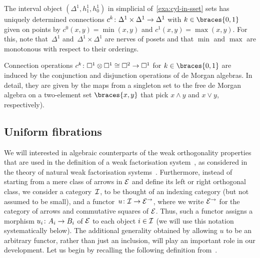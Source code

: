 \documentclass[reqno,10pt,a4paper,oneside,draft]{amsart}
\begin{document}
\begin{example}
The interval object $(\Delta^1, h_1^1, h_0^1)$ in simplicial of~\cref{exa:cyl-in-sset} sets has uniquely determined connections $c^k \co \Delta^1 \times \Delta^1 \to \Delta^1$ with $k \in \braces{0, 1}$ given on points by $c^0(x, y) = \min(x, y)$ and $c^1(x, y) = \max(x, y)$.
For this, note that~$\Delta^1$ and~$\Delta^1 \times \Delta^1$ are nerves of posets and that $\min$ and $\max$ are monotonous with respect to their orderings.
\end{example}

\begin{example}
Connection operations $c^k \co \Box^1 \otimes \Box^1 \iso \Box^2 \to \Box^1$ for $k \in \braces{0, 1}$ are induced by the conjunction and disjunction operations of de Morgan algebras.
In detail, they are given by the maps from a singleton set to the free de Morgan algebra on a two-element set $\braces{x, y}$ that pick $x \wedge y$ and $x \vee y$, respectively).
\end{example}

\subsection*{Uniform fibrations}
We will interested in algebraic counterparts of the weak orthogonality properties that are used in the definition of a weak factorisation system~\cite{bousfield-wfs}, as considered in the theory of natural weak factorisation systems~\cite{grandis-tholen-nwfs}.
Furthermore, instead of starting from a mere class of arrows in $\catE$ and define its left or right orthogonal class, we consider a category~$\cal{I}$, to be thought of an indexing category (but not assumed to be small), and a functor~$u \co \cal{I} \to \catE^\to$, where we write $\catE^\to$ for the category of arrows and commutative squares of $\catE$.
Thus, such a functor assigns a morphism $u_i \co A_i \to B_i$ of $\catE$ to each object $i \in \cal{I}$ (we will use this notation
systematically below).
The additional generality obtained by allowing $u$ to be an arbitrary functor, rather than just an inclusion, will play an important role in our development.
Let us begin by recalling the following definition from~\cite{garner:small-object-argument}.
\end{document}
